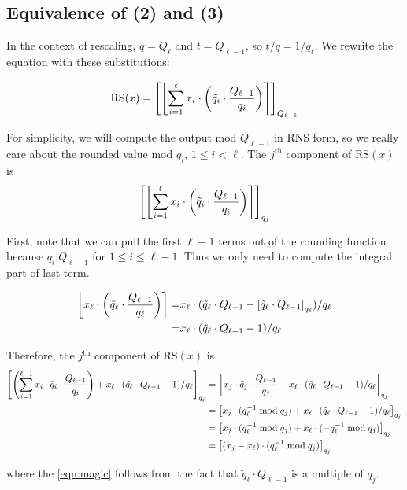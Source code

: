 \subsection{Equivalence of (2) and (3)}

In the context of rescaling, $q = Q_\ell$ and $t=Q_{\ell-1}$, so $t/q = 1 / q_\ell$. We rewrite the equation with these substitutions:

\[\mathrm{RS}(x) = \bracks*{\round*{\sum_{i=1}^\ell x_i\cdot\parens*{\tilde{q}_i\cdot\frac{Q_{\ell-1}}{q_i}}}}_{Q_{\ell-1}}\]

For simplicity, we will compute the output mod $Q_{\ell-1}$ in RNS form, so we really care about the rounded value mod $q_i$, $1\le i < \ell$. The $j^\text{th}$ component of $\mathrm{RS}(x)$ is
\[\bracks*{\round*{\sum_{i=1}^\ell x_i\cdot\parens*{\tilde{q}_i\cdot\frac{Q_{\ell-1}}{q_i}}}}_{q_j}\]

First, note that we can pull the first $\ell-1$ terms out of the rounding function because $q_i | Q_{\ell-1}$ for $1\le i \le \ell-1$. Thus we only need to compute the integral part of last term.

\begin{align}
	\round*{x_\ell\cdot\parens*{\tilde{q}_\ell\cdot\frac{Q_{\ell-1}}{q_\ell}}} = & x_\ell\cdot\parens{\tilde{q}_\ell\cdot Q_{\ell-1} -			 \bracks*{\tilde{q}_\ell\cdot Q_{\ell-1}}_{q_\ell}}/q_\ell \\
	= & x_\ell\cdot\parens{\tilde{q}_\ell\cdot Q_{\ell-1} -	1}/q_\ell
\end{align}

Therefore, the $j^\text{th}$ component of $\mathrm{RS}(x)$ is
\begin{align}
	\bracks*{\parens*{\sum_{i=1}^{\ell-1} x_i\cdot\tilde{q}_i\cdot\frac{Q_{\ell-1}}{q_i}} + x_\ell\cdot\parens{\tilde{q}_\ell\cdot Q_{\ell-1} - 1}/q_\ell}_{q_j} & = \bracks*{x_j\cdot\tilde{q}_j\cdot\frac{Q_{\ell-1}}{q_j} + x_\ell\cdot\parens{\tilde{q}_\ell\cdot Q_{\ell-1} - 1}/q_\ell}_{q_j} \\
	& = \bracks*{x_j\cdot (q_\ell^{-1} \bmod q_j) + x_\ell\cdot\parens{\tilde{q}_\ell\cdot Q_{\ell-1} - 1}/q_\ell}_{q_j} \\
	& = \bracks*{x_j\cdot (q_\ell^{-1} \bmod q_j) + x_\ell\cdot(-q_\ell^{-1} \bmod q_j)}_{q_j} \label{eqn:magic} \\
	& = \bracks*{(x_j-x_\ell)\cdot (q_\ell^{-1} \bmod q_j)}_{q_j}
\end{align}

where the \cref{eqn:magic} follows from the fact that $\tilde{q}_\ell\cdot Q_{\ell-1}$ is a multiple of $q_j$.

